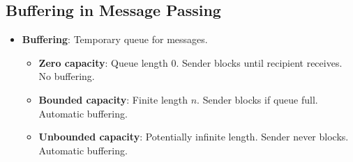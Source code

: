 \subsection{Buffering in Message Passing}
\begin{itemize}
    \item \textbf{Buffering}: Temporary queue for messages.
        \begin{itemize}
            \item \textbf{Zero capacity}: Queue length 0. Sender blocks until recipient receives. No buffering.
            \item \textbf{Bounded capacity}: Finite length $n$. Sender blocks if queue full. Automatic buffering.
            \item \textbf{Unbounded capacity}: Potentially infinite length. Sender never blocks. Automatic buffering.
        \end{itemize}
\end{itemize}
